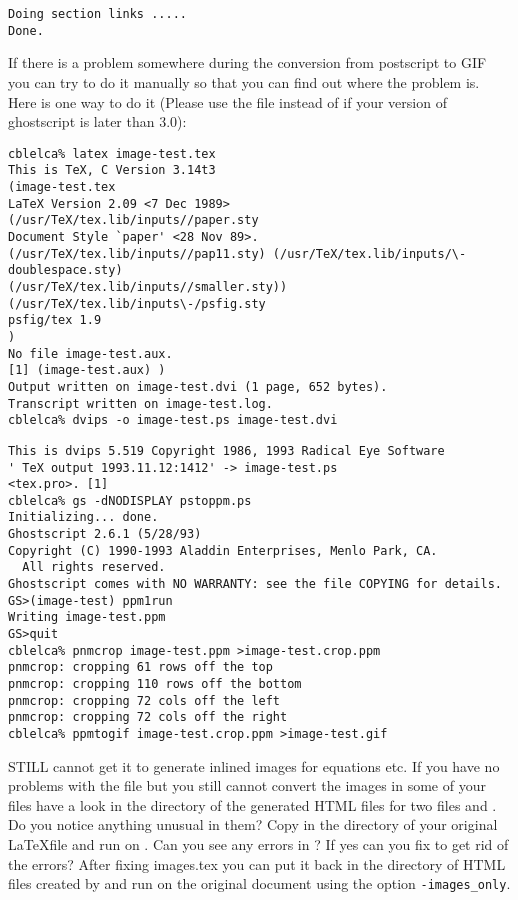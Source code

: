 \begin{htmllist}
\begin{verbatim}
Doing section links .....
Done.
\end{verbatim}


If there is a problem somewhere during the conversion from postscript
to GIF you can try to do it manually so that you can find out where
the problem is. Here is one way to do it (Please use the 
file instead of  if your version of ghostscript is
later than 3.0):

\begin{verbatim}
cblelca% latex image-test.tex
This is TeX, C Version 3.14t3
(image-test.tex
LaTeX Version 2.09 <7 Dec 1989>
(/usr/TeX/tex.lib/inputs//paper.sty
Document Style `paper' <28 Nov 89>.
(/usr/TeX/tex.lib/inputs//pap11.sty) (/usr/TeX/tex.lib/inputs/\-doublespace.sty)
(/usr/TeX/tex.lib/inputs//smaller.sty)) (/usr/TeX/tex.lib/inputs\-/psfig.sty
psfig/tex 1.9
)
No file image-test.aux.
[1] (image-test.aux) )
Output written on image-test.dvi (1 page, 652 bytes).
Transcript written on image-test.log.
cblelca% dvips -o image-test.ps image-test.dvi
\end{verbatim}
\begin{verbatim}
This is dvips 5.519 Copyright 1986, 1993 Radical Eye Software
' TeX output 1993.11.12:1412' -> image-test.ps
<tex.pro>. [1] 
cblelca% gs -dNODISPLAY pstoppm.ps
Initializing... done.
Ghostscript 2.6.1 (5/28/93)
Copyright (C) 1990-1993 Aladdin Enterprises, Menlo Park, CA.
  All rights reserved.
Ghostscript comes with NO WARRANTY: see the file COPYING for details.
GS>(image-test) ppm1run 
Writing image-test.ppm
GS>quit
cblelca% pnmcrop image-test.ppm >image-test.crop.ppm
pnmcrop: cropping 61 rows off the top
pnmcrop: cropping 110 rows off the bottom
pnmcrop: cropping 72 cols off the left
pnmcrop: cropping 72 cols off the right
cblelca% ppmtogif image-test.crop.ppm >image-test.gif
\end{verbatim}

\item [STILL cannot get it to generate inlined images for equations
etc.]
If you have no problems with the  file but you
still cannot convert the images in some of your files 
have a look in the directory of the generated
HTML files for two files  and . Do you notice
anything unusual in them? Copy  in the directory 
of your original \LaTeX file and run  on .
Can you see any errors in ? If yes can you fix
 to get rid of the errors? After fixing {\fn
images.tex}
you can put it back in the directory of HTML files created by
\latextohtml{} and run \latextohtml{} on the original document 
using the option \texttt{-images\_only}. 


\end{htmllist}
